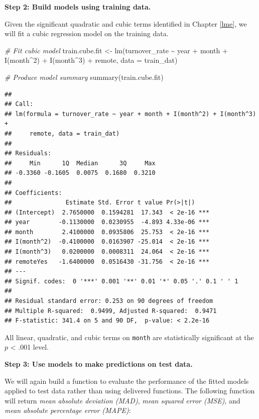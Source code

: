 \documentclass[
]{book}
\newenvironment{Shaded}{\begin{snugshade}}{\end{snugshade}}
\newcommand{\AttributeTok}[1]{\textcolor[rgb]{0.77,0.63,0.00}{#1}}
\newcommand{\CommentTok}[1]{\textcolor[rgb]{0.56,0.35,0.01}{\textit{#1}}}
\newcommand{\DecValTok}[1]{\textcolor[rgb]{0.00,0.00,0.81}{#1}}
\newcommand{\FunctionTok}[1]{\textcolor[rgb]{0.00,0.00,0.00}{#1}}
\newcommand{\NormalTok}[1]{#1}
\newcommand{\OtherTok}[1]{\textcolor[rgb]{0.56,0.35,0.01}{#1}}
\newcommand{\SpecialCharTok}[1]{\textcolor[rgb]{0.00,0.00,0.00}{#1}}
\begin{document}
\textbf{Step 2: Build models using training data.}

Given the significant quadratic and cubic terms identified in Chapter \ref{lme}, we will fit a cubic regression model on the training data.

\begin{Shaded}
\begin{Highlighting}[]
\CommentTok{\# Fit cubic model}
\NormalTok{train.cube.fit }\OtherTok{\textless{}{-}} \FunctionTok{lm}\NormalTok{(turnover\_rate }\SpecialCharTok{\textasciitilde{}}\NormalTok{ year }\SpecialCharTok{+}\NormalTok{ month }\SpecialCharTok{+} \FunctionTok{I}\NormalTok{(month}\SpecialCharTok{\^{}}\DecValTok{2}\NormalTok{) }\SpecialCharTok{+} \FunctionTok{I}\NormalTok{(month}\SpecialCharTok{\^{}}\DecValTok{3}\NormalTok{) }\SpecialCharTok{+}\NormalTok{ remote, }\AttributeTok{data =}\NormalTok{ train\_dat)}

\CommentTok{\# Produce model summary}
\FunctionTok{summary}\NormalTok{(train.cube.fit)}
\end{Highlighting}
\end{Shaded}

\begin{verbatim}
## 
## Call:
## lm(formula = turnover_rate ~ year + month + I(month^2) + I(month^3) + 
##     remote, data = train_dat)
## 
## Residuals:
##     Min      1Q  Median      3Q     Max 
## -0.3360 -0.1605  0.0075  0.1680  0.3210 
## 
## Coefficients:
##               Estimate Std. Error t value Pr(>|t|)    
## (Intercept)  2.7650000  0.1594281  17.343  < 2e-16 ***
## year        -0.1130000  0.0230955  -4.893 4.33e-06 ***
## month        2.4100000  0.0935806  25.753  < 2e-16 ***
## I(month^2)  -0.4100000  0.0163907 -25.014  < 2e-16 ***
## I(month^3)   0.0200000  0.0008311  24.064  < 2e-16 ***
## remoteYes   -1.6400000  0.0516430 -31.756  < 2e-16 ***
## ---
## Signif. codes:  0 '***' 0.001 '**' 0.01 '*' 0.05 '.' 0.1 ' ' 1
## 
## Residual standard error: 0.253 on 90 degrees of freedom
## Multiple R-squared:  0.9499, Adjusted R-squared:  0.9471 
## F-statistic: 341.4 on 5 and 90 DF,  p-value: < 2.2e-16
\end{verbatim}

All linear, quadratic, and cubic terms on \texttt{month} are statistically significant at the \(p\) \textless{} .001 level.

\textbf{Step 3: Use models to make predictions on test data.}

We will again build a function to evaluate the performance of the fitted models applied to test data rather than using delivered functions. The following function will return \emph{mean absolute deviation (MAD)}, \emph{mean squared error (MSE)}, and \emph{mean absolute percentage error (MAPE)}:
\end{document}
